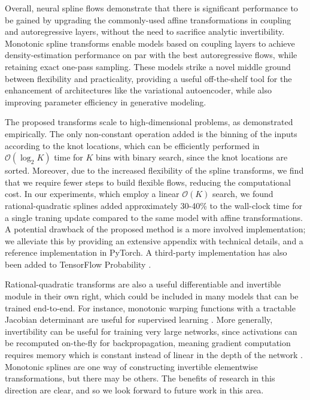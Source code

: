 Overall, neural spline flows demonstrate that there is significant performance to be gained by upgrading the commonly-used affine transformations in coupling and autoregressive layers, without the need to sacrifice analytic invertibility. 
Monotonic spline transforms enable models based on coupling layers to achieve density-estimation performance on par with the best autoregressive flows, while retaining exact one-pass sampling. 
These models strike a novel middle ground between flexibility and practicality, providing a useful off-the-shelf tool for the enhancement of architectures like the variational autoencoder, while also improving parameter efficiency in generative modeling.

The proposed transforms scale to high-dimensional problems, as demonstrated empirically.
The only non-constant operation added is the binning of the inputs according to the knot locations, which can be efficiently performed in $\mathcal{O}(\log_{2}K)$ time for $K$ bins with binary search, since the knot locations are sorted.
Moreover, due to the increased flexibility of the spline transforms, we find that we require fewer steps to build flexible flows, reducing the computational cost.
In our experiments, which employ a linear $ \mathcal{O}(K) $ search, we found rational-quadratic splines added approximately 30-40\% to the wall-clock time for a single traning update compared to the same model with affine transformations. 
A potential drawback of the proposed method is a more involved implementation; 
we alleviate this by providing an extensive appendix with technical details, and a reference implementation in PyTorch. 
A third-party implementation has also been added to TensorFlow Probability \citep{dillon2017tensorflowdistributions}.

Rational-quadratic transforms are also a useful differentiable and invertible module in their own right, which could be included in many models that can be trained end-to-end.
For instance, monotonic warping functions with a tractable Jacobian determinant are
useful for supervised learning \citep{snelson:2003:warpedgp}.
More generally, invertibility can be useful for training very large networks, since activations can be recomputed on-the-fly for backpropagation, meaning gradient computation requires memory which is constant instead of linear in the depth of the network \citep{Gomez:2017:revnet, MacKay:2018:revrnn}.
Monotonic splines are one way of constructing invertible elementwise transformations, but there may be others. The benefits of research in this direction are clear, and so we look forward to future work in this area.
